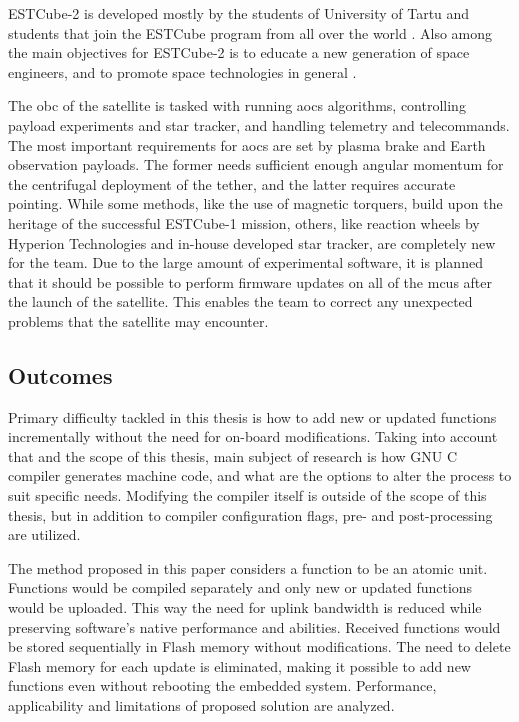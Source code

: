 ESTCube-2 is developed mostly by the students of University of Tartu and students that join the ESTCube program from all over the world \cite{Ehrpais2016}. Also among the main objectives for ESTCube-2 is to educate a new generation of space engineers, and to promote space technologies in general \cite{Iakubivskyi2016}.

The \gls{obc} of the satellite is tasked with running \gls{aocs} algorithms, controlling payload experiments and star tracker, and handling telemetry and telecommands. The most important requirements for \gls{aocs} are set by plasma brake and Earth observation payloads. The former needs sufficient enough angular momentum for the centrifugal deployment of the tether, and the latter requires accurate pointing. While some methods, like the use of magnetic torquers, build upon the heritage of the successful ESTCube-1 mission, others, like reaction wheels by Hyperion Technologies and in-house developed star tracker, are completely new for the team. Due to the large amount of experimental software, it is planned that it should be possible to perform firmware updates on all of the \glspl{mcu} after the launch of the satellite. This enables the team to correct any unexpected problems that the satellite may encounter. \cite{Ehrpais2016}


\subsection{Outcomes}

Primary difficulty tackled in this thesis is how to add new or updated functions incrementally without the need for on-board modifications. Taking into account that and the scope of this thesis, main subject of research is how GNU C compiler generates machine code, and what are the options to alter the process to suit specific needs. Modifying the compiler itself is outside of the scope of this thesis, but in addition to compiler configuration flags, pre- and post-processing are utilized.

The method proposed in this paper considers a function to be an atomic unit. Functions would be compiled separately and only new or updated functions would be uploaded.  This way the need for uplink bandwidth is reduced while preserving software's native performance and abilities. Received functions would be stored sequentially in Flash memory without modifications. The need to delete Flash memory for each update is eliminated, making it possible to add new functions even without rebooting the embedded system. Performance, applicability and limitations of proposed solution are analyzed.

